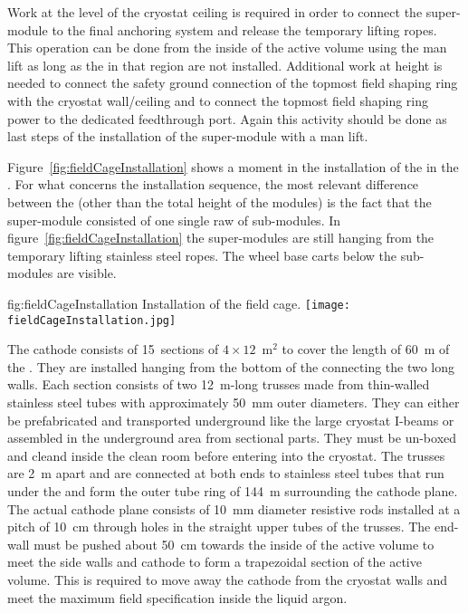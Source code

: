 Work at the level of the cryostat ceiling is required in order to connect the super-module to the final anchoring system and release the temporary lifting ropes.
This operation can be done from the inside of the active volume using the man lift as long as the  in that region are not installed.
Additional work at height is needed to connect the safety ground connection of the topmost field shaping ring with the cryostat wall/ceiling and to connect the topmost field shaping ring power to the dedicated feedthrough port.
Again this activity should be done as last steps of the installation of the super-module with a man lift.

Figure~\ref{fig:fieldCageInstallation} shows a moment in the installation of the  in the .
For what concerns the installation sequence, the most relevant difference between the  (other than the total height of the modules) is the fact that the super-module consisted of one single raw of sub-modules.
In figure~\ref{fig:fieldCageInstallation} the super-modules are still hanging from the temporary lifting stainless steel ropes.
The wheel base carts below the sub-modules are visible.
\begin{dunefigure}{fig:fieldCageInstallation}
{Installation of the  field cage.}
\texttt{[image: fieldCageInstallation.jpg]}
\end{dunefigure}

The cathode consists of 15~sections of $4 \times 12$~m$^2$ to cover the length of 60~m of the  .
They are installed hanging from the bottom of the  connecting the two long walls.
Each section consists of two 12~m-long trusses made from thin-walled stainless steel tubes with approximately 50~mm outer diameters.
They can either be prefabricated and transported underground like the large cryostat I-beams or assembled in the underground area from sectional parts.
They must be un-boxed and cleand inside the clean room before entering into the cryostat.
The trusses are 2~m apart and are connected at both ends to stainless steel tubes that run under the  and form the outer tube ring of 144~m surrounding the cathode plane.
The actual cathode plane consists of 10~mm diameter resistive rods installed at a pitch of 10~cm through holes in the straight upper tubes of the trusses.
The  end-wall must be pushed about 50~cm towards the inside of the active volume to meet the  side walls and cathode to form a trapezoidal section of the active volume.
This is required to move away the cathode from the cryostat walls and meet the maximum field specification inside the liquid argon.

